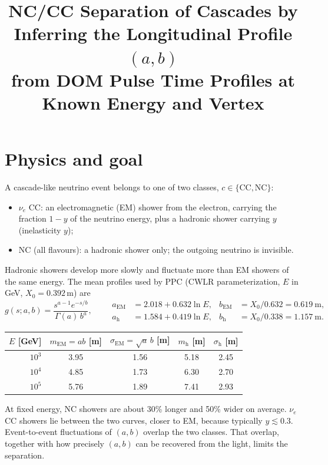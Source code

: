 \documentclass[11pt]{article}
\title{NC/CC Separation of Cascades by Inferring the Longitudinal Profile $(a,b)$\\
from DOM Pulse Time Profiles at Known Energy and Vertex}
\author{}
\date{}
\theoremstyle{definition}
\newcommand{\CC}{\mathrm{CC}}
\newcommand{\NC}{\mathrm{NC}}
\begin{document}
\maketitle

\section{Physics and goal}

A cascade-like neutrino event belongs to one of two classes, $c\in\{\CC,\NC\}$:
\begin{itemize}
  \item $\nu_e$ CC: an electromagnetic (EM) shower from the electron, carrying the fraction
        $1-y$ of the neutrino energy, plus a hadronic shower carrying $y$ (inelasticity $y$);
  \item NC (all flavours): a hadronic shower only; the outgoing neutrino is invisible.
\end{itemize}
Hadronic showers develop more slowly and fluctuate more than EM showers of the same energy.
The mean profiles used by PPC (CWLR parameterization, $E$ in GeV, $X_0 = 0.392$\,m) are
\begin{equation}
  g(s;a,b) = \frac{s^{a-1}e^{-s/b}}{\Gamma(a)\,b^{a}},\qquad
  \begin{aligned}
    a_{\text{EM}} &= 2.018 + 0.632\ln E, & b_{\text{EM}} &= X_0/0.632 = 0.619\ \text{m},\\
    a_{\text{h}} &= 1.584 + 0.419\ln E, & b_{\text{h}} &= X_0/0.338 = 1.157\ \text{m}.
  \end{aligned}
\end{equation}

\begin{center}
\begin{tabular}{rcccc}
\toprule
$E$ [GeV] & $m_{\text{EM}} = ab$ [m] & $\sigma_{\text{EM}} = \sqrt{a}\,b$ [m] & $m_{\text{h}}$ [m] & $\sigma_{\text{h}}$ [m]\\
\midrule
$10^3$ & 3.95 & 1.56 & 5.18 & 2.45 \\
$10^4$ & 4.85 & 1.73 & 6.30 & 2.70 \\
$10^5$ & 5.76 & 1.89 & 7.41 & 2.93 \\
\bottomrule
\end{tabular}
\end{center}

At fixed energy, NC showers are about 30\% longer and 50\% wider on average. $\nu_e$ CC showers
lie between the two curves, closer to EM, because typically $y\lesssim0.3$. Event-to-event
fluctuations of $(a,b)$ overlap the two classes. That overlap, together with how precisely
$(a,b)$ can be recovered from the light, limits the separation.
\end{document}
